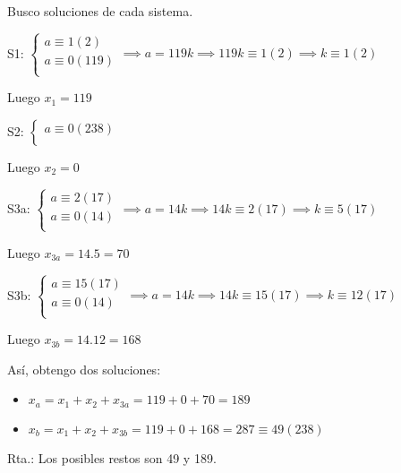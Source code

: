 Busco soluciones de cada sistema.

S1: $ \begin{cases}
    a \equiv 1(2) \\
    a \equiv 0(119) \\
\end{cases} \implies a = 119k \implies 119k \equiv 1(2) \implies k \equiv 1(2) $

Luego $ x_1 = 119 $

S2: $ \begin{cases}
    a \equiv 0(238) \\
\end{cases} $

Luego $ x_2 = 0 $

S3a: $ \begin{cases}
    a \equiv 2(17) \\
    a \equiv 0(14) \\
\end{cases} \implies a = 14k \implies 14k \equiv 2(17) \implies k \equiv 5(17) $

Luego $ x_{3a} = 14.5 = 70 $

S3b: $ \begin{cases}
    a \equiv 15(17) \\
    a \equiv 0(14) \\
\end{cases} \implies a = 14k \implies 14k \equiv 15(17) \implies k \equiv 12(17) $

Luego $ x_{3b} = 14.12 = 168 $

Así, obtengo dos soluciones:
\begin{itemize}
    \item $ x_a = x_1 + x_2 + x_{3a} = 119+0+70 = 189 $
    \item $ x_b = x_1 + x_2 + x_{3b} = 119+0+168 = 287 \equiv 49(238) $
\end{itemize}

Rta.: Los posibles restos son 49 y 189.


